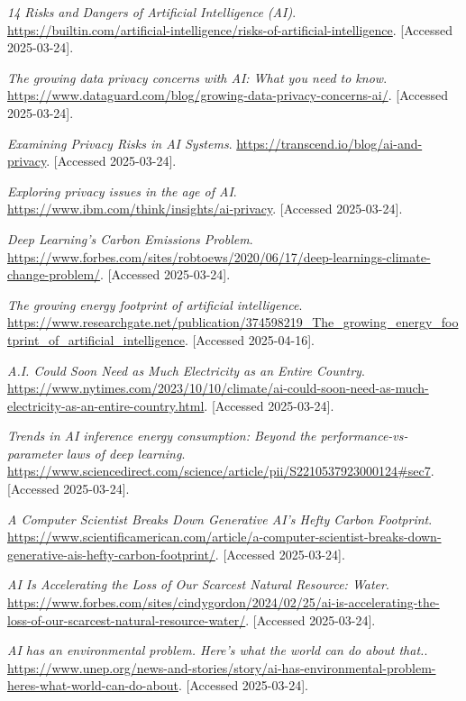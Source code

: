 \documentclass[licencjacka,en]{pracamgr}
\begin{document}
\begin{thebibliography}{99}
\textit{ 14 Risks and Dangers of Artificial Intelligence (AI)}.
\url{https://builtin.com/artificial-intelligence/risks-of-artificial-intelligence}.
[Accessed 2025-03-24].

\textit{The growing data privacy concerns with AI: What you need to know}.
\url{https://www.dataguard.com/blog/growing-data-privacy-concerns-ai/}.
[Accessed 2025-03-24].

\textit{Examining Privacy Risks in AI Systems}.
\url{https://transcend.io/blog/ai-and-privacy}.
[Accessed 2025-03-24].

\textit{Exploring privacy issues in the age of AI}.
\url{https://www.ibm.com/think/insights/ai-privacy}.
[Accessed 2025-03-24].

\textit{Deep Learning’s Carbon Emissions Problem}.
\url{https://www.forbes.com/sites/robtoews/2020/06/17/deep-learnings-climate-change-problem/}.
[Accessed 2025-03-24].

\textit{The growing energy footprint of artificial intelligence}.
\url{https://www.researchgate.net/publication/374598219_The_growing_energy_footprint_of_artificial_intelligence}.
[Accessed 2025-04-16].

\textit{A.I. Could Soon Need as Much Electricity as an Entire Country}.
\url{https://www.nytimes.com/2023/10/10/climate/ai-could-soon-need-as-much-electricity-as-an-entire-country.html}.
[Accessed 2025-03-24].

\textit{Trends in AI inference energy consumption: Beyond the performance-vs-parameter laws of deep learning}.
\url{https://www.sciencedirect.com/science/article/pii/S2210537923000124#sec7}.
[Accessed 2025-03-24].

\textit{A Computer Scientist Breaks Down Generative AI’s Hefty Carbon Footprint}.
\url{https://www.scientificamerican.com/article/a-computer-scientist-breaks-down-generative-ais-hefty-carbon-footprint/}.
[Accessed 2025-03-24].

\textit{AI Is Accelerating the Loss of Our Scarcest Natural Resource: Water}.
\url{https://www.forbes.com/sites/cindygordon/2024/02/25/ai-is-accelerating-the-loss-of-our-scarcest-natural-resource-water/}.
[Accessed 2025-03-24].

\textit{AI has an environmental problem. Here’s what the world can do about that.}.
\url{https://www.unep.org/news-and-stories/story/ai-has-environmental-problem-heres-what-world-can-do-about}.
[Accessed 2025-03-24].


\end{thebibliography}
\end{document}
